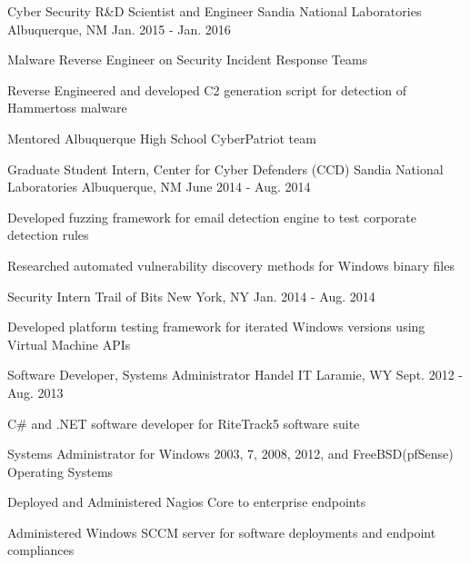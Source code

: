 \begin{cventries}

\cventry
{Cyber Security R\&D Scientist and Engineer} %
{Sandia National Laboratories} %
{Albuquerque, NM} %
{Jan. 2015 - Jan. 2016} %
{ %
\begin{cvitems}
\item {Malware Reverse Engineer on Security Incident Response Teams}
\item {Reverse Engineered and developed C2 generation script for detection of Hammertoss malware}
\item {Mentored Albuquerque High School CyberPatriot team}
\end{cvitems}
}


\cventry
{Graduate Student Intern, Center for Cyber Defenders (CCD)} %
{Sandia National Laboratories} %
{Albuquerque, NM} %
{June 2014 - Aug. 2014} %
{ %
\begin{cvitems}
\item {Developed fuzzing framework for email detection engine to test corporate detection rules}
\item {Researched automated vulnerability discovery methods for Windows binary files}
\end{cvitems}
}


\cventry
{Security Intern} %
{Trail of Bits} %
{New York, NY} %
{Jan. 2014 - Aug. 2014} %
{ %
\begin{cvitems}
\item {Developed platform testing framework for iterated Windows versions using Virtual Machine APIs}
\end{cvitems}
}


\cventry
{Software Developer, Systems Administrator} %
{Handel IT} %
{Laramie, WY} %
{Sept. 2012 - Aug. 2013} %
{ %
\begin{cvitems}
\item {C\# and .NET software developer for RiteTrack5 software suite}
\item {Systems Administrator for Windows 2003, 7, 2008, 2012, and FreeBSD(pfSense) Operating Systems}
\item {Deployed and Administered Nagios Core to enterprise endpoints}
\item {Administered Windows SCCM server for software deployments and endpoint compliances}
\end{cvitems} 
}


\end{cventries}
